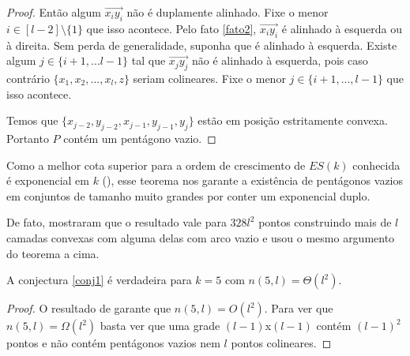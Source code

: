 \begin{proof}
    Então algum $\overrightarrow{x_iy_i}$ não é duplamente alinhado. Fixe o menor $i\in[l-2]\setminus\{1\}$ que isso acontece. Pelo fato \ref{fato2}, $\overrightarrow{x_iy_i}$ é alinhado à esquerda ou à direita. Sem perda de generalidade, suponha que é alinhado à esquerda. Existe algum $j\in\{i+1,...l-1\}$ tal que $\overrightarrow{x_jy_j}$ não é alinhado à esquerda, pois caso contrário $\{x_1,x_2,...,x_l,z\}$ seriam colineares. Fixe o menor $j\in\{i+1,...,l-1\}$ que isso acontece.

    Temos que $\{x_{j-2},y_{j-2},x_{j-1},y_{j-1},y_j\}$ estão em posição estritamente convexa. Portanto $P$ contém um pentágono vazio.

\end{proof}

Como a melhor cota superior para a ordem de crescimento de $ES(k)$ conhecida é exponencial em $k$ (\cite{ESbound}), esse teorema nos garante a existência de pentágonos vazios em conjuntos de tamanho muito grandes por conter um exponencial duplo.

De fato, \cite{pentagon2} mostraram que o resultado vale para $328l^2$ pontos construindo mais de $l$ camadas convexas com alguma delas com arco vazio e usou o mesmo argumento do teorema a cima.

\begin{corolario}
    A conjectura \ref{conj1} é verdadeira para $k=5$ com $n(5,l)=\Theta(l^2)$.
\end{corolario}
\begin{proof}
    O resultado de \cite{pentagon2} garante que $n(5,l)=O(l^2)$. Para ver que $n(5,l)=\Omega(l^2)$ basta ver que uma grade $(l-1)$x$(l-1)$ contém $(l-1)^2$ pontos e não contém pentágonos vazios nem $l$ pontos colineares.
\end{proof}

